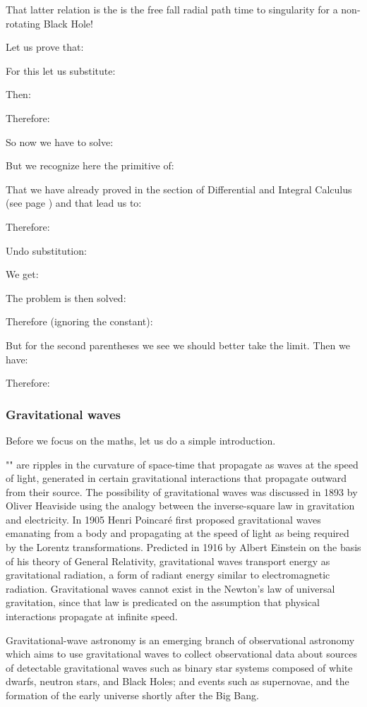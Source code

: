 	That latter relation is the is the free fall radial path time to singularity for a non-rotating Black Hole!
	
	Let us prove that:
	
	
	For this let us substitute:
	
	Then:
	
	Therefore:
	
	So now we have to solve:
	
	But we recognize here the primitive of:
	
	That we have already proved in the section of Differential and Integral Calculus (see page \pageref{black hole primitive}) and that lead us to:
	
	Therefore:
	
	Undo substitution:
	
	We get:
	
	The problem is then solved:
	
	Therefore (ignoring the constant):
	
	But for the second parentheses we see we should better take the limit. Then we have:
	
	Therefore:
	
		
	\pagebreak
	\subsubsection{Gravitational waves}
	Before we focus on the maths, let us do a simple introduction.
	
	"" are ripples in the curvature of space-time that propagate as waves at the speed of light, generated in certain gravitational interactions that propagate outward from their source. The possibility of gravitational waves was discussed in 1893 by Oliver Heaviside using the analogy between the inverse-square law in gravitation and electricity. In 1905 Henri Poincaré first proposed gravitational waves emanating from a body and propagating at the speed of light as being required by the Lorentz transformations. Predicted in 1916 by Albert Einstein on the basis of his theory of General Relativity, gravitational waves transport energy as gravitational radiation, a form of radiant energy similar to electromagnetic radiation. Gravitational waves cannot exist in the Newton's law of universal gravitation, since that law is predicated on the assumption that physical interactions propagate at infinite speed.
	
	Gravitational-wave astronomy is an emerging branch of observational astronomy which aims to use gravitational waves to collect observational data about sources of detectable gravitational waves such as binary star systems composed of white dwarfs, neutron stars, and Black Holes; and events such as supernovae, and the formation of the early universe shortly after the Big Bang.
	
